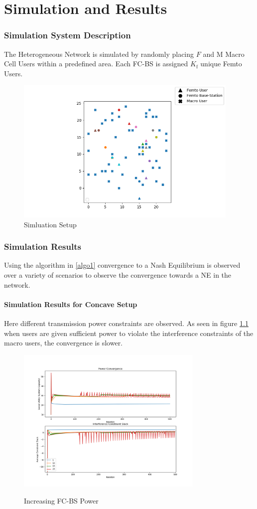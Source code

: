 \documentclass[12pt,a4paper]{report}
\begin{document}
\chapter{Simulation and Results}
\subsection{Simulation System Description}
The Heterogeneous Network is simulated by randomly placing $F $ and M Macro Cell Users within a predefined area. Each FC-BS is assigned $K_{\mathrm{f}}$ unique Femto Users. 
\begin{figure}[h!]
	\includegraphics[width=\textwidth,height = 7cm]{figures/system_figure}
	  \caption{Simluation Setup}
\end{figure}

\subsection{Simulation Results}
Using the algorithm in \ref{algo1} convergence to a Nash Equilibrium is observed over a variety of scenarios to observe the convergence towards a NE in the network. 
\subsubsection{Simulation Results for Concave Setup}
 Here different transmission power constraints are observed. As seen in figure \ref{fig:power} when users are given sufficient power to violate the interference constraints of the macro users, the convergence is slower.
\begin{figure}[h!]
	  \caption{Increasing FC-BS Power}
	\includegraphics[width=\textwidth,height = 7cm]{figures/power_active}
	  \label{fig:power}
\end{figure}
\end{document}
